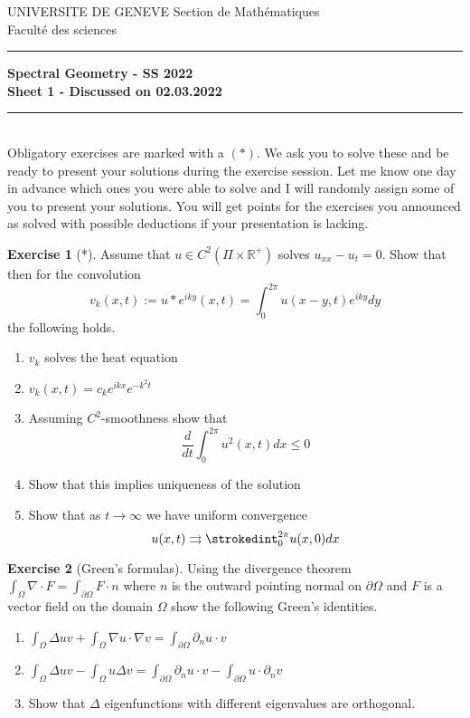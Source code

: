 \documentclass[a4paper,11pt]{article}
\theoremstyle{definition}
\newtheorem{exercise}{Exercise}
\begin{document}
\pagestyle{headings}
\noindent UNIVERSITE DE GENEVE \hfill Section de Mathématiques\\
\noindent Facult\'e des sciences \hfill \\[-3mm]
\hrule

\large

\begin{center}
\textbf{Spectral Geometry - SS 2022 \\ Sheet 1 - Discussed on 02.03.2022}
\end{center}
\hrule
\text{}\\[1cm]

Obligatory exercises are marked with a $(*)$. We ask you to solve these and be ready to present your solutions during the exercise session. Let me know one day in advance which ones you were able to solve and I will randomly assign some of you to present your solutions. You will get points for the exercises you announced as solved with possible deductions if your presentation is lacking.

\begin{exercise}[*]
	Assume that $u \in C^2(\Pi \times \mathbb{R}^+)$ solves $u_{xx} - u_t = 0$. Show that then for the convolution 
	\[v_k(x,t) := u * e^{iky} (x,t) = \int_0^{2\pi} u(x - y, t) e^{iky} dy \]
	the following holds.

	\begin{enumerate}
		\item $v_k$ solves the heat equation
		\item $v_k(x,t) = c_k e^{ikx} e^{-k^2 t}$
		\item Assuming $C^2$-smoothness show that 
		\[ \frac{d}{dt} \int_0^{2\pi} u^2(x,t) dx \leq 0\]
		\item Show that this implies uniqueness of the solution
		\item Show that as $t \to \infty$ we have uniform convergence
		\[ u(x, t) \rightrightarrows \strokedint_0^{2\pi} u(x, 0) dx \] 
	\end{enumerate}
\end{exercise}

\begin{exercise}[Green's formulas]
	Using the divergence theorem $\int_\Omega \nabla \cdot F = \int_{\partial \Omega} F \cdot n$ where $n$ is the outward pointing normal on $\partial \Omega$ and $F$ is a vector field on the domain $\Omega$ show the following Green's identities.
	\begin{enumerate}
		\item $\int_\Omega \Delta u v + \int_\Omega \nabla u \cdot \nabla v = \int_{\partial \Omega} \partial_n u \cdot v$
		\item $\int_\Omega \Delta u v - \int_\Omega u \Delta v = \int_{\partial \Omega} \partial_n u \cdot v - \int_{\partial \Omega} u \cdot \partial_n v$
		\item Show that $\Delta$ eigenfunctions with different eigenvalues are orthogonal.
	\end{enumerate}
\end{exercise}
\end{document}
